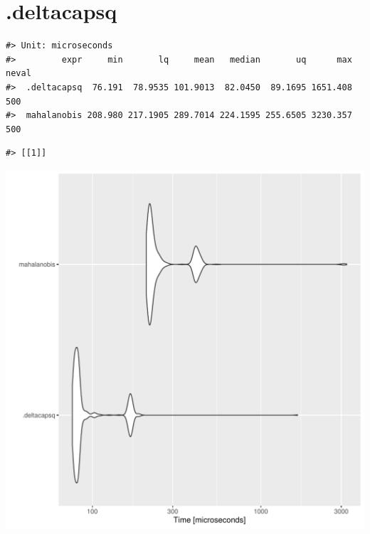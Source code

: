 \documentclass{article}\usepackage[]{graphicx}\usepackage[]{color}
\makeatletter
\newenvironment{kframe}{%
 \def\at@end@of@kframe{}%
 \ifinner\ifhmode%
  \def\at@end@of@kframe{\end{minipage}}%
  \begin{minipage}{\columnwidth}%
 \fi\fi%
 \def\FrameCommand##1{\hskip\@totalleftmargin \hskip-\fboxsep
 \colorbox{shadecolor}{##1}\hskip-\fboxsep
     \hskip-\linewidth \hskip-\@totalleftmargin \hskip\columnwidth}%
 \MakeFramed {\advance\hsize-\width
   \@totalleftmargin\z@ \linewidth\hsize
   \@setminipage}}%
 {\par\unskip\endMakeFramed%
 \at@end@of@kframe}
\newenvironment{knitrout}{}{} %
\makeatother
\begin{document}
\newpage

\section{.deltacapsq}



\begin{knitrout}
\color{fgcolor}\begin{kframe}
\begin{verbatim}
#> Unit: microseconds
#>         expr     min       lq     mean   median       uq      max neval
#>  .deltacapsq  76.191  78.9535 101.9013  82.0450  89.1695 1651.408   500
#>  mahalanobis 208.980 217.1905 289.7014 224.1595 255.6505 3230.357   500
\end{verbatim}


{\ttfamily\noindent\itshape\color{messagecolor}{\#> Coordinate system already present. Adding new coordinate system, which will replace the existing one.}}\begin{verbatim}
#> [[1]]
\end{verbatim}
\end{kframe}
\includegraphics[width=1\linewidth]{man/figures/latex-test-benchmark-linearAlgebra-deltacapsq-dot-1} 

\end{knitrout}
\end{document}
